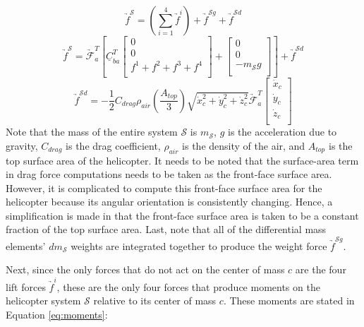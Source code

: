 \documentclass[journal]{IEEEtran}
\begin{document}
\begin{equation}
\underrightarrow{f}^{\mathcal{S}}=(\sum_{i=1}^4\underrightarrow{f}^i)+\underrightarrow{f}^{\mathcal{S}g}+\underrightarrow{f}^{\mathcal{S}d}
\label{eq:force1}
\end{equation}
\begin{equation}
\underrightarrow{f}^{\mathcal{S}}=\underrightarrow{\mathcal{F}}^T_a[\underline{C}^T_{ba}\left[ \begin{array}{c}
				0 \\
				0 \\
				f^1+f^2+f^3+f^4 \\
				\end{array} \right]+\left[ \begin{array}{c}
								0 \\
								0 \\
								-m_{\mathcal{S}}g \\
								\end{array} \right]]+\underrightarrow{f}^{\mathcal{S}d}
\label{eq:force2}
\end{equation}
\begin{equation}
\underrightarrow{f}^{\mathcal{S}d}=-\frac{1}{2}C_{drag}\rho_{air}(\frac{A_{top}}{3})\sqrt{\dot{x}^2_c+\dot{y}^2_c+\dot{z}^2_c}\underrightarrow{\mathcal{F}}^T_a\left[ \begin{array}{c}
				\dot{x}_c \\
				\dot{y}_c \\
				\dot{z}_c \\
				\end{array} \right]
\label{eq:force3}
\end{equation}
Note that the mass of the entire system $\mathcal{S}$ is $m_{\mathcal{S}}$, $g$ is the acceleration due to gravity, $C_{drag}$ is the drag coefficient, $\rho_{air}$ is the density of the air, and $A_{top}$ is the top surface area of the helicopter. It needs to be noted that the surface-area term in drag force computations needs to be taken as the front-face surface area. However, it is complicated to compute this front-face surface area for the helicopter because its angular orientation is consistently changing. Hence, a simplification is made in that the front-face surface area is taken to be a constant fraction of the top surface area. Last, note that all of the differential mass elements' $dm_{\mathcal{S}}$ weights are integrated together to produce the weight force $\underrightarrow{f}^{\mathcal{S}g}$.

Next, since the only forces that do not act on the center of mass $c$ are the four lift forces $\underrightarrow{f}^i$, these are the only four forces that produce moments on the helicopter system $\mathcal{S}$ relative to its center of mass $c$. These moments are stated in Equation \ref{eq:moments}:
\end{document}
